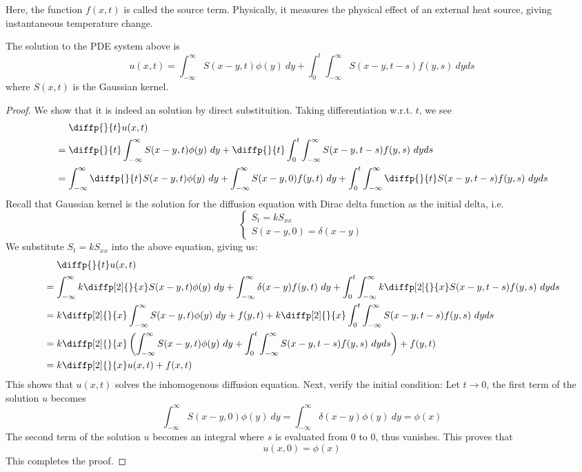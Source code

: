 Here, the function $f(x,t)$ is called the source term. Physically, it measures the physical effect of an external heat source, giving instantaneous temperature change.

\medskip 

\begin{thm}
    The solution to the PDE system above is 
    \[u(x,t) = \int_{-\infty}^{\infty} S(x-y,t)\phi(y)\ dy + \int_0^t \int_{-\infty}^{\infty} S(x-y,t-s)f(y,s)\ dyds\]
    where $S(x,t)$ is the Gaussian kernel.
\end{thm}

\begin{proof}
    We show that it is indeed an solution by direct substituition. Taking differentiation w.r.t. $t$, we see 
    \begin{align*}
        &\ \ \ \ \diffp{}{t}u(x,t) \\
        &= \diffp{}{t} \int_{-\infty}^{\infty} S(x-y,t)\phi(y)\ dy + \diffp{}{t}\int_0^t \int_{-\infty}^{\infty} S(x-y,t-s)f(y,s)\ dyds\\
        &=  \int_{-\infty}^{\infty} \diffp{}{t}S(x-y,t)\phi(y)\ dy + \int_{-\infty}^{\infty}S(x-y,0)f(y,t)\ dy + \int_0^t \int_{-\infty}^{\infty} \diffp{}{t}S(x-y,t-s)f(y,s)\ dyds\\
    \end{align*}
    Recall that Gaussian kernel is the solution for the diffusion equation with Dirac delta function as the initial delta, i.e.
    \[\begin{cases}
        S_t = kS_{xx} \\
        S(x-y,0) = \delta(x-y)
    \end{cases}\]
    We substitute $S_t = kS_{xx}$ into the above equation, giving us:
    \begin{align*}
        &\ \ \ \ \diffp{}{t}u(x,t) \\
        &=  \int_{-\infty}^{\infty} k\diffp[2]{}{x}S(x-y,t)\phi(y)\ dy + \int_{-\infty}^{\infty}\delta(x-y)f(y,t)\ dy + \int_0^t \int_{-\infty}^{\infty} k\diffp[2]{}{x}S(x-y,t-s)f(y,s)\ dyds\\
        &= k\diffp[2]{}{x} \int_{-\infty}^{\infty} S(x-y,t)\phi(y)\ dy + f(y,t)+ k\diffp[2]{}{x}\int_0^t \int_{-\infty}^{\infty} S(x-y,t-s)f(y,s)\ dyds\\
        &= k\diffp[2]{}{x}\br{\int_{-\infty}^{\infty} S(x-y,t)\phi(y)\ dy + \int_0^t \int_{-\infty}^{\infty} S(x-y,t-s)f(y,s)\ dyds} + f(y,t)\\
        &= k\diffp[2]{}{x} u(x,t) + f(x,t)
    \end{align*}
    This shows that $u(x,t)$ solves the inhomogenous diffusion equation. Next, verify the initial condition: Let $t\to 0$, the first term of the solution $u$ becomes
    \[\int_{-\infty}^{\infty} S(x-y,0)\phi(y)\ dy = \int_{-\infty}^\infty \delta(x-y)\phi(y)\ dy = \phi(x)\]
    The second term of the solution $u$ becomes an integral where $s$ is evaluated from $0$ to $0$, thus vanishes. This proves that 
    \[u(x,0) = \phi(x)\]
    This completes the proof.
\end{proof}


